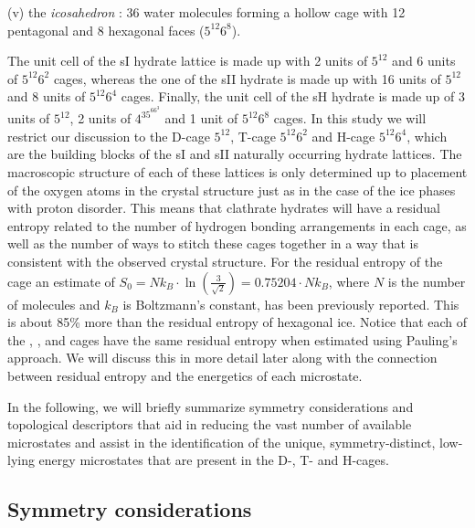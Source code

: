 \documentclass[11pt, proquest]{uwthesis}[2020/02/24]
\let\ce\ch
\begin{document}
	\par (v) the \textit{icosahedron} \ce{(H2O)_{36}}: 36 water molecules forming a hollow cage with 12 pentagonal and 8 hexagonal faces ($5^{12}6^8$).

\par The unit cell of the sI hydrate lattice is made up with 2 units of $5^{12}$ and 6 units of $5^{12}6^2$ cages, whereas the one of the sII hydrate is made up with 16 units of $5^{12}$ and 8 units of $5^{12}6^4$ cages. Finally, the unit cell of the sH hydrate is made up of 3 units of $5^{12}$, 2 units of $4^35^66^3$ and 1 unit of $5^{12}6^8$ cages.\autocite{sloan_jr_clathrate_2007} In this study we will restrict our discussion to the D-cage $5^{12}$, T-cage $5^{12}6^2$ and H-cage $5^{12}6^4$, which are the building blocks of the sI and sII naturally occurring hydrate lattices.\autocite{sloan_jr_clathrate_2007} The macroscopic structure of each of these lattices is only determined up to placement of the oxygen atoms in the crystal structure just as in the case of the ice phases with proton disorder. This means that clathrate hydrates will have a residual entropy related to the number of hydrogen bonding arrangements in each cage, as well as the number of ways to stitch these cages together\autocite{yoo_low-energy_2009} in a way that is consistent with the observed crystal structure. For the residual entropy of the \ce{(H2O)_{20}} cage an estimate of $S_0=Nk_B\cdot\ln(\frac{3}{\sqrt{2}})=0.75204\cdot Nk_B$, where $N$ is the number of molecules and $k_B$ is Boltzmann's constant, has been previously reported.\autocite{kirov_identifying_2008,kirov_f-structure_1994} This is about 85\% more than the residual entropy of hexagonal ice.\autocite{pauling_structure_1935} Notice that each of the \ce{(H2O)_{20}}, \ce{(H2O)_{24}}, and \ce{(H2O)_{28}} cages have the same residual entropy when estimated using Pauling’s approach.\autocite{pauling_structure_1935} We will discuss this in more detail later along with the connection between residual entropy and the energetics of each microstate.

\par In the following, we will briefly summarize symmetry considerations and topological descriptors that aid in reducing the vast number of available microstates and assist in the identification of the unique, symmetry-distinct, low-lying energy microstates that are present in the D-, T- and H-cages.

\subsection{Symmetry considerations}
\end{document}
